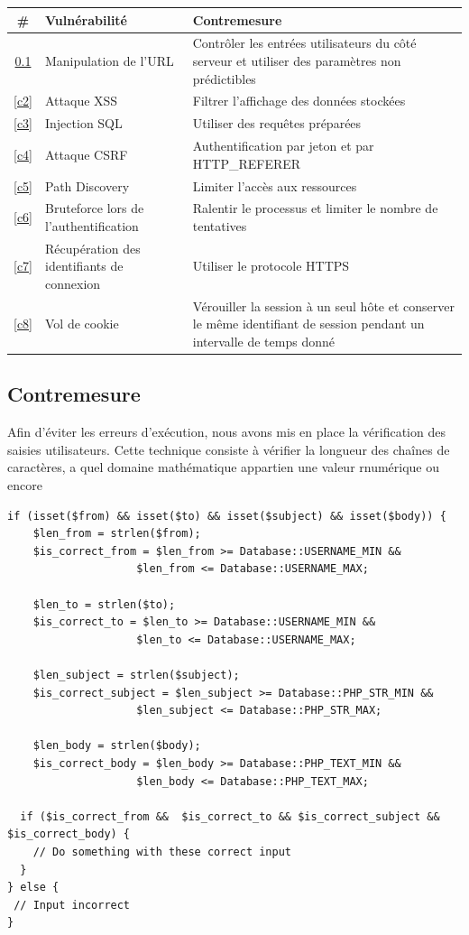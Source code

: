 \documentclass[12pt]{article}
\begin{document}
\begin{tabular}{| c | p{7.5cm} | p{7.5cm} |}
  \hline			
  \textbf{\# } &\textbf{ Vulnérabilité }& \textbf{Contremesure} \\
  \hline  
  \ref{c1} & Manipulation de l'URL & Contrôler les entrées utilisateurs du côté serveur et utiliser des paramètres non prédictibles \\
  \hline
  \ref{c2} & Attaque XSS & Filtrer l'affichage des données stockées \\
  \hline
  \ref{c3} & Injection SQL & Utiliser des requêtes préparées \\
  \hline
  \ref{c4} & Attaque CSRF & Authentification par jeton et par HTTP\_REFERER \\
  \hline
  \ref{c5} & Path Discovery & Limiter l'accès aux ressources \\
  \hline
  \ref{c6} & Bruteforce lors de l'authentification & Ralentir le processus et limiter le nombre de tentatives \\
  \hline
  \ref{c7} & Récupération des identifiants de connexion & Utiliser le protocole HTTPS \\
  \hline
  \ref{c8} & Vol de cookie & Vérouiller la session à un seul hôte et conserver le même identifiant de session pendant un intervalle de temps donné \\
  \hline
\end{tabular}

\subsection{Contremesure}\label{c1}

Afin d'éviter les erreurs d'exécution, nous avons mis en place la vérification des saisies utilisateurs. Cette technique consiste à vérifier la longueur des chaînes de caractères, a quel domaine mathématique appartien une valeur rnumérique ou encore 

\begin{lstlisting}[style=JAVA]
if (isset($from) && isset($to) && isset($subject) && isset($body)) {
    $len_from = strlen($from);
    $is_correct_from = $len_from >= Database::USERNAME_MIN && 
                    $len_from <= Database::USERNAME_MAX;
                            
    $len_to = strlen($to);
    $is_correct_to = $len_to >= Database::USERNAME_MIN && 
                    $len_to <= Database::USERNAME_MAX;

    $len_subject = strlen($subject);
    $is_correct_subject = $len_subject >= Database::PHP_STR_MIN && 
                    $len_subject <= Database::PHP_STR_MAX;
                            
    $len_body = strlen($body);
    $is_correct_body = $len_body >= Database::PHP_TEXT_MIN && 
                    $len_body <= Database::PHP_TEXT_MAX;

  if ($is_correct_from &&  $is_correct_to && $is_correct_subject && $is_correct_body) {
    // Do something with these correct input
  }
} else {
 // Input incorrect
}
\end{lstlisting}
\end{document}
